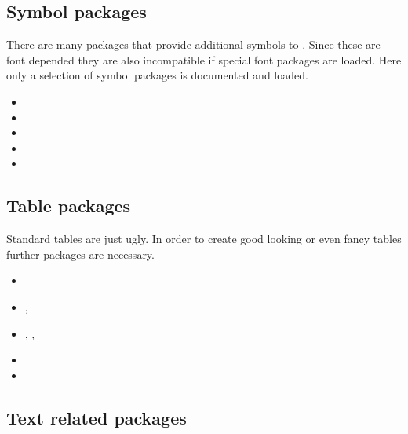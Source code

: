 
\subsection{Symbol packages}
There are many packages that provide additional symbols to \latex . Since these are font depended they are also incompatible if special font packages are loaded. Here only a selection of symbol packages is documented and loaded.

\begin{itemize}[noitemsep]
\item {}
\item {}
\item {}
\item {}
\item {}
\end{itemize}


\subsection{Table packages}
Standard \latex tables are just ugly. In order to create good looking or even fancy tables further packages are necessary.

\begin{itemize}[noitemsep]
\item {}
\item {}, 
\item {}, , 
\item {}
\item {}
\end{itemize}
 

\subsection{Text related packages}

